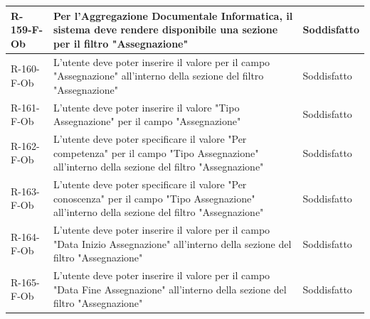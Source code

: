 \begin{longtable}{|p{2.5cm}|p{9.5cm}|p{2.5cm}|}
\hline
R-159-F-Ob & Per l'Aggregazione Documentale Informatica, il sistema deve rendere disponibile una sezione per il filtro "Assegnazione" & Soddisfatto \\
\hline
R-160-F-Ob & L'utente deve poter inserire il valore per il campo "Assegnazione" all'interno della sezione del filtro "Assegnazione" & Soddisfatto \\
\hline
R-161-F-Ob & L'utente deve poter inserire il valore "Tipo Assegnazione" per il campo "Assegnazione" & Soddisfatto \\
\hline
R-162-F-Ob & L'utente deve poter specificare il valore "Per competenza" per il campo "Tipo Assegnazione" all'interno della sezione del filtro "Assegnazione" & Soddisfatto \\
\hline
R-163-F-Ob & L'utente deve poter specificare il valore "Per conoscenza" per il campo "Tipo Assegnazione" all'interno della sezione del filtro "Assegnazione" & Soddisfatto \\
\hline
R-164-F-Ob & L'utente deve poter inserire il valore per il campo "Data Inizio Assegnazione" all'interno della sezione del filtro "Assegnazione" & Soddisfatto \\
\hline
R-165-F-Ob & L'utente deve poter inserire il valore per il campo "Data Fine Assegnazione" all'interno della sezione del filtro "Assegnazione" & Soddisfatto \\
\hline



\end{longtable}
